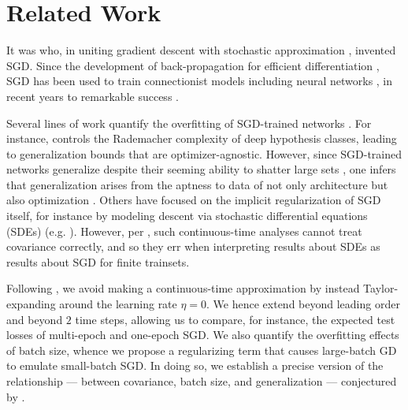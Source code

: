 \documentclass{article}
\theoremstyle{plain}
\theoremstyle{definition}
\begin{document}

\section{Related Work} \label{sect:related}


    It was \citet{ki52} who, in uniting gradient descent \citep{ca47} with
    stochastic approximation \citep{ro51}, invented SGD.  Since the development
    of back-propagation for efficient differentiation \citep{we74}, SGD
    has been used to train connectionist models including neural
    networks \citep{bo91}, in recent years to remarkable success \citep{le15}.


    Several lines of work quantify the overfitting of SGD-trained networks
    \citep{ne17a}.  For instance, \citet{ba17} controls the Rademacher
    complexity of deep hypothesis classes, leading to generalization bounds
    that are optimizer-agnostic.  However, since SGD-trained networks
    generalize despite their seeming ability to shatter large sets
    \citep{zh17}, one infers that generalization arises from the aptness to
    data of not only architecture but also optimization \citep{ne17b}.  Others
    have focused on the implicit regularization of SGD itself, for instance by
    modeling descent via stochastic differential equations (SDEs) (e.g.
    \citet{ch18}).  However, per \citet{ya19a}, such continuous-time analyses
    cannot treat covariance correctly, and so they err when interpreting
    results about SDEs as results about SGD for finite trainsets.


    Following \citet{ro18}, we avoid making a continuous-time approximation by
    instead Taylor-expanding around the learning rate $\eta=0$.  We hence
    extend \citet{ro18} beyond leading order and beyond $2$ time steps,
    allowing us to compare, for instance, the expected test losses of
    multi-epoch and one-epoch SGD.  We also quantify the overfitting effects of
    batch size, whence we propose a regularizing term that causes large-batch
    GD to emulate small-batch SGD.  In doing so, we establish a precise version
    of the relationship --- between covariance, batch size, and generalization
    --- conjectured by \citet{ja18}.  
    
\end{document}
